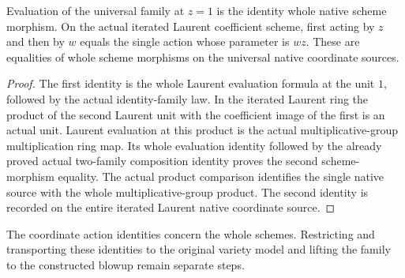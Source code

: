 \begin{lemma}
\label{lem:native-laurent-action-coordinate-laws}
\leanok
Evaluation of the universal family at $z=1$ is the identity whole native
scheme morphism.  On the actual iterated Laurent coefficient scheme,
first acting by $z$ and then by $w$ equals the single action whose
parameter is $wz$.  These are equalities of whole scheme morphisms on the
universal native coordinate sources.
\end{lemma}
\begin{proof}
The first identity is the whole Laurent evaluation formula at the unit
$1$, followed by the actual identity-family law.  In the iterated Laurent
ring the product of the second Laurent unit with the coefficient image
of the first is an actual unit.  Laurent evaluation at this product is
the actual multiplicative-group multiplication ring map.  Its whole
evaluation identity followed by the already proved actual two-family
composition identity proves the second scheme-morphism equality.
The actual product comparison identifies the single native source with
the whole multiplicative-group product.  The second identity is recorded
on the entire iterated Laurent native coordinate source.
\end{proof}

The coordinate action identities concern the whole schemes.  Restricting
and transporting these identities to the original variety model and
lifting the family to the constructed blowup remain separate steps.
